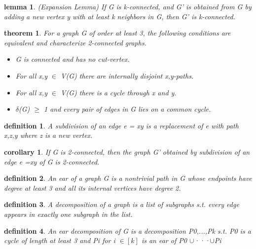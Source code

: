 \documentclass[twocolumn]{article}
\newtheorem{theorem}{theorem}[section]  %
\newtheorem{definition}{definition}
\newtheorem{lemma}{lemma}
\newtheorem{corollary}{corollary}
\begin{document}
\begin{CJK*}{UTF8}{bkai}
    \begin{lemma}{(Expansion Lemma)}
        If G is k-connected, and G' is obtained from G by adding a new vertex y with
 at least k neighbors in G, then G' is k-connected.
    \end{lemma}

    \begin{theorem}
         For a graph G of order at least 3, the following conditions are equivalent and
 characterize 2-connected graphs.

 \begin{itemize}
    \item G is connected and has no cut-vertex.
 \item For all x,y $\in$ V(G) there are internally disjoint x,y-paths.
 \item For all x,y $\in$ V(G) there is a cycle through x and y.
 \item $\delta$(G) $\geq$ 1 and every pair of edges in G lies on a common cycle.\end{itemize}
    \end{theorem}

    \begin{definition}
         A subdivision of an edge e = xy is a replacement of e with path x,z,y where z
 is a new vertex.
    \end{definition}

    \begin{corollary}
         If G is 2-connected, then the graph G' obtained by subdivision of an edge
 e =xy of G is 2-connected.
    \end{corollary}

    \begin{definition}
         An ear of a graph G is a nontrivial path in G whose endpoints have degree at
 least 3 and all its internal vertices have degree 2.
    \end{definition}

    \begin{definition}
         A decomposition of a graph is a list of subgraphs s.t. every edge appears in
 exactly one subgraph in the list.
    \end{definition}

    \begin{definition}
         An ear decomposition of G is a 
         decomposition P0,...,Pk s.t. 
         P0 is a cycle of
 length at least 3 and Pi for i $\in [k]$ is an 
 ear of P0 $\cup $···$\cup $Pi
    \end{definition}


\end{CJK*}
\end{document}
